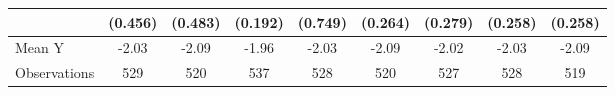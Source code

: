 {\begin{tabular}{l*{8}{c}}
            &     (0.456)         &     (0.483)         &     (0.192)         &     (0.749)         &     (0.264)         &     (0.279)         &     (0.258)         &     (0.258)         \\
\midrule
Mean Y      &       -2.03         &       -2.09         &       -1.96         &       -2.03         &       -2.09         &       -2.02         &       -2.03         &       -2.09         \\
Observations&         529         &         520         &         537         &         528         &         520         &         527         &         528         &         519         \\
\bottomrule
\end{tabular}
}
